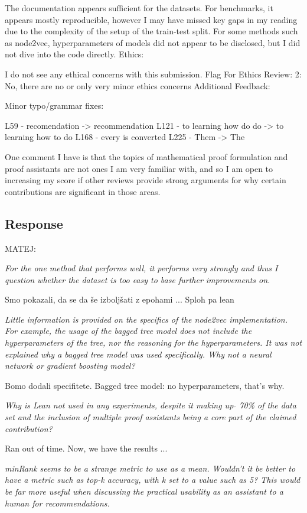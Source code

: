 \documentclass{article}
\begin{document}
The documentation appears sufficient for the datasets. For benchmarks, it appears mostly reproducible, however I may have missed key gaps in my reading due to the complexity of the setup of the train-test split. For some methods such as node2vec, hyperparameters of models did not appear to be disclosed, but I did not dive into the code directly.
Ethics:

I do not see any ethical concerns with this submission.
Flag For Ethics Review: 2: No, there are no or only very minor ethics concerns
Additional Feedback:

Minor typo/grammar fixes:

L59 - recomendation -> recommendation L121 - to learning how do do -> to learning how to do L168 - every is converted L225 - Them -> The

One comment I have is that the topics of mathematical proof formulation and proof assistants are not ones I am very familiar with, and so I am open to increasing my score if other reviews provide strong arguments for why certain contributions are significant in those areas.
\subsection{Response}

MATEJ:

\textit{For the one method that performs well, it performs very strongly and thus I question whether the dataset is too easy to base further improvements on.}

Smo pokazali, da se da še izboljšati z epohami ... Sploh pa lean

\textit{Little information is provided on the specifics of the node2vec implementation. For example, the usage of the bagged tree model does not include the hyperparameters of the tree, nor the reasoning for the hyperparameters. It was not explained why a bagged tree model was used specifically. Why not a neural network or gradient boosting model?}

Bomo dodali specifitete. Bagged tree model: no hyperparameters, that's why.

\textit{Why is Lean not used in any experiments, despite it making up $\tilde{}$ 70\% of the data set and the inclusion of multiple proof assistants being a core part of the claimed contribution?}

Ran out of time. Now, we have the results ...

\textit{minRank seems to be a strange metric to use as a mean. Wouldn't it be better to have a metric such as top-k accuracy, with k set to a value such as 5? This would be far more useful when discussing the practical usability as an assistant to a human for recommendations.}
\end{document}
